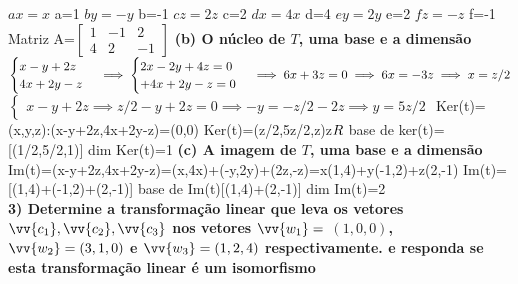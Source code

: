 \documentclass[11pt,a4paper]{article}
\newcommand\tab[1][1.835cm]{\hspace*{#1}}
\newcommand\taba[1][2.55cm]{\hspace*{#1}}
\begin{document}
\begin{flushleft}
\taba$ax=x$ a=1\linebreak
\taba$by=-y$ b=-1\linebreak
\taba$cz=2z$ c=2\linebreak
\taba$dx=4x$ d=4\linebreak
\taba$ey=2y$ e=2\linebreak
\taba$fz=-z$ f=-1\linebreak
\taba Matriz A=$\begin{bmatrix}
1&-1&2\\
4&2&-1
\end{bmatrix}$\linebreak
\newline \newline
\taba\textbf{(b) O núcleo de $T$, uma base e a dimensão }\linebreak
\taba$
\begin{cases}
x-y+2z\\
4x+2y-z
\end{cases}\implies\begin{cases}
2x-2y+4z=0\\
+4x+2y-z=0
\end{cases}\implies6x+3z=0\implies6x=-3z\implies x=z/2\linebreak
$
\taba$
\begin{cases}
x-y+2z\implies z/2-y+2z=0 \implies -y=-z/2-2z \implies  y=5z/2
\end{cases}
$\linebreak
\taba Ker(t)={(x,y,z):(x-y+2z,4x+2y-z)=(0,0)}\linebreak
\taba Ker(t)={(z/2,5z/2,z)z$\mathnormal{R}$}\linebreak
\taba base de ker(t)=[(1/2,5/2,1)]\linebreak
\taba dim Ker(t)=1\linebreak \newline \newline
\taba\textbf{(c) A imagem de $T$, uma base e a dimensão} \linebreak
\taba Im(t)=(x-y+2z,4x+2y-z)=(x,4x)+(-y,2y)+(2z,-z)=x(1,4)+y(-1,2)+z(2,-1)\linebreak
\taba Im(t)=[(1,4)+(-1,2)+(2,-1)]\linebreak
\taba base de Im(t)[(1,4)+(2,-1)]\linebreak
\taba dim Im(t)=2\linebreak
\\
\tab \textbf{3) Determine a transformação linear que leva os vetores $\vv{c_1}, \vv{c_2}, \vv{c_3}$ nos vetores $\vv{w_1}=$ $(1,0,0)$, $\vv{w_2}=(3,1,0)$ e $\vv{w_3}=(1,2,4)$ respectivamente. e responda se esta transformação linear é um isomorfismo} \linebreak

\end{flushleft}
\end{document}
